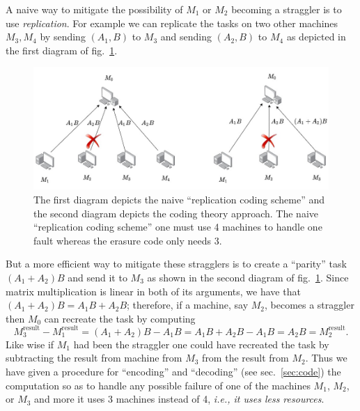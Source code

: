 \documentclass{report}
\begin{document}
A naive way to mitigate the possibility of $M_1$ or $M_2$ becoming a straggler is to use \textit{replication}. For example we can replicate the tasks on two other machines $M_3,M_4$ by sending $(A_1,B)$ to $M_3$ and sending $(A_2,B)$ to $M_4$ as depicted in the first diagram of fig.~\ref{fig:3}. 
\begin{figure}
    \centering
    \includegraphics[width=\textwidth]{strag_diag_2.jpg}
    \caption{
    The first diagram depicts the naive ``replication coding scheme'' and the second diagram depicts the coding theory approach. The naive ``replication coding scheme'' one must use 4 machines to handle one fault whereas the erasure code only needs 3.
    }
    \label{fig:3}
\end{figure}
But a more efficient way to mitigate these stragglers is to create a ``parity'' task $(A_1+A_2)B$ and send it to $M_3$ as shown in the second diagram of fig.~\ref{fig:3}. Since matrix multiplication is linear in both of its arguments, we have that $(A_1+A_2)B = A_1B+A_2B$; therefore, if a machine, say $M_2$, becomes a straggler then $M_0$ can recreate the task by computing 
\begin{equation*}
    M_{3}^\text{result} - M_{1}^\text{result} =  (A_1+A_2)B - A_1B = A_1B+A_2B- A_1B = A_2B = M_2^\text{result}.
\end{equation*}
Like wise if $M_1$ had been the straggler one could have recreated the task by subtracting the result from machine from $M_3$ from the result from $M_2$. Thus we have given a procedure for ``encoding'' and ``decoding'' (see sec.~\ref{sec:code}) the computation so as to handle any possible failure of one of the machines $M_1$, $M_2$, or $M_3$ and more it uses 3 machines instead of 4, \emph{i.e., it uses less resources}.
\end{document}
